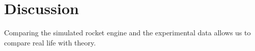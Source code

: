 \chapter{Discussion}

Comparing the simulated rocket engine and the experimental data allows us to compare real life with theory.
